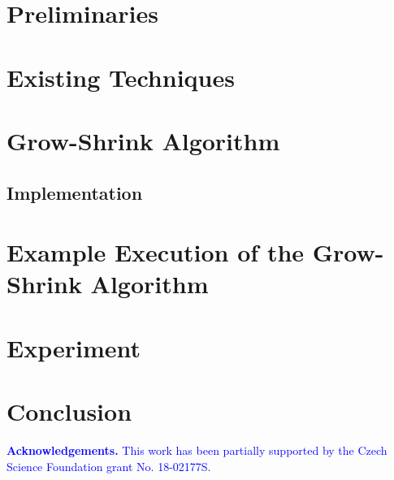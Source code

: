\documentclass{llncs}
\newcommand{\todo}[1] {
  \textcolor{todocolor}{TODO: #1}
}
\newcommand{\new}[1]{\textcolor{blue}{#1}}
\begin{document}
%

\section{Preliminaries}
\label{sec:preliminaries}



\section{Existing Techniques}
\label{sec:existing-techniques}



\section{Grow-Shrink Algorithm}
\label{sec:algorithm}


\subsection{Implementation}
\label{sec:implementation}


\section{Example Execution of the Grow-Shrink Algorithm}
\label{sec:example-execution}






\section{Experiment}
\label{sec:experiment}


\section{Conclusion}
\label{sec:conclusions}



\medskip
\noindent
\new{
\textbf{Acknowledgements.} \hspace{5pt} This work has been partially supported by the Czech Science Foundation grant No. 18-02177S.}




\end{document}
